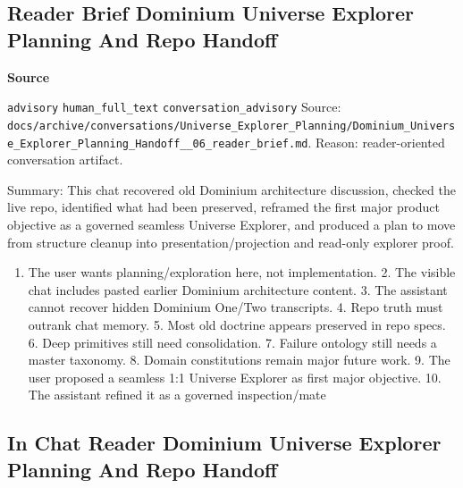 \documentclass[9pt,a4paper,openany]{book}
\newcommand{\vonecallout}[3]{\par\medskip\noindent\begingroup\setlength{\fboxsep}{7pt}\colorbox{DomCalloutBg}{\parbox{0.94\linewidth}{\textbf{\textcolor{#1}{#2}}\par #3}}\endgroup\par\medskip}
\begin{document}
\subsection{Reader Brief Dominium Universe Explorer Planning And Repo Handoff}

\vonecallout{DomSlate}{Source}{\texttt{advisory} \texttt{human\_\allowbreak{}full\_\allowbreak{}text} \texttt{conversation\_\allowbreak{}advisory} Source: \texttt{docs/\allowbreak{}archive/\allowbreak{}conversations/\allowbreak{}Universe\_\allowbreak{}Explorer\_\allowbreak{}Planning/\allowbreak{}Dominium\_\allowbreak{}Universe\_\allowbreak{}Explorer\_\allowbreak{}Planning\_\allowbreak{}Handoff\_\allowbreak{}\_\allowbreak{}06\_\allowbreak{}reader\_\allowbreak{}brief.\allowbreak{}md}.\allowbreak{} Reason: reader-\allowbreak{}oriented conversation artifact.\allowbreak{}}

Summary: This chat recovered old Dominium architecture discussion, checked the live repo, identified what had been preserved, reframed the first major product objective as a governed seamless Universe Explorer, and produced a plan to move from structure cleanup into presentation/\allowbreak{}projection and read-\allowbreak{}only explorer proof.\allowbreak{}


\begin{enumerate}
\item The user wants planning/\allowbreak{}exploration here, not implementation.\allowbreak{} 2.\allowbreak{} The visible chat includes pasted earlier Dominium architecture content.\allowbreak{} 3.\allowbreak{} The assistant cannot recover hidden Dominium One/\allowbreak{}Two transcripts.\allowbreak{} 4.\allowbreak{} Repo truth must outrank chat memory.\allowbreak{} 5.\allowbreak{} Most old doctrine appears preserved in repo specs.\allowbreak{} 6.\allowbreak{} Deep primitives still need consolidation.\allowbreak{} 7.\allowbreak{} Failure ontology still needs a master taxonomy.\allowbreak{} 8.\allowbreak{} Domain constitutions remain major future work.\allowbreak{} 9.\allowbreak{} The user proposed a seamless 1:1 Universe Explorer as first major objective.\allowbreak{} 10.\allowbreak{} The assistant refined it as a governed inspection/\allowbreak{}mate
\end{enumerate}


\subsection{In Chat Reader Dominium Universe Explorer Planning And Repo Handoff}
\end{document}
